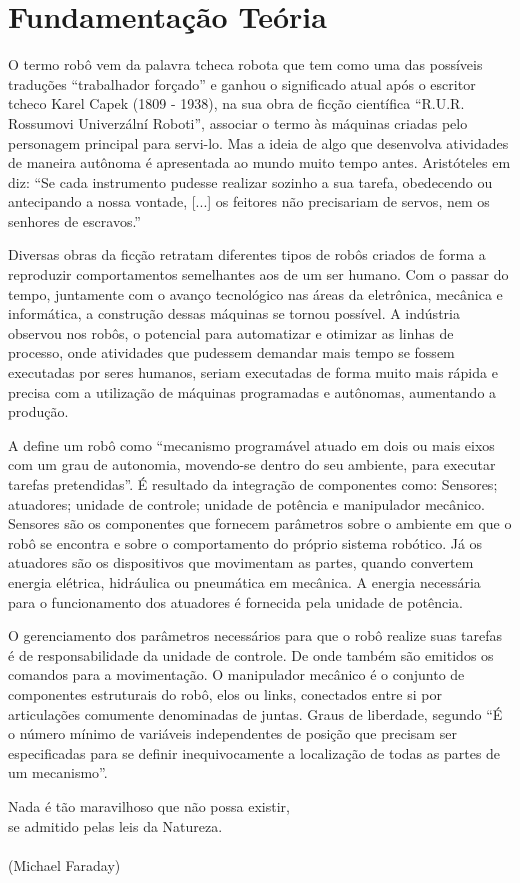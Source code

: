 \chapter{Fundamentação Teória}
\label{chap:concep}
O termo robô vem da palavra tcheca robota que tem como uma das possíveis traduções “trabalhador forçado” e ganhou o significado atual após o escritor tcheco Karel Capek (1809 - 1938), na sua obra de ficção científica “R.U.R. Rossumovi Univerzální Roboti”, associar o termo às máquinas criadas pelo personagem principal para servi-lo. Mas a ideia de algo que desenvolva atividades de maneira autônoma é apresentada ao mundo muito tempo antes. Aristóteles em \cite{aristoteles1985traduccao} diz: “Se cada instrumento pudesse realizar sozinho a sua tarefa, obedecendo ou antecipando a nossa vontade, [...] os feitores não precisariam de servos, nem os senhores de escravos.” 

Diversas obras da ficção retratam diferentes tipos de robôs criados de forma a reproduzir comportamentos semelhantes aos de um ser humano. Com o passar do tempo, juntamente com o avanço tecnológico nas áreas da eletrônica, mecânica e informática, a construção dessas máquinas se tornou possível. A indústria observou nos robôs, o potencial para automatizar e otimizar as linhas de processo, onde atividades que pudessem demandar mais tempo se fossem executadas por seres humanos, seriam executadas de forma muito mais rápida e precisa com a utilização de máquinas programadas e autônomas, aumentando a produção.

A \cite{iso2012} define um robô como “mecanismo programável atuado em dois ou mais eixos com um grau de autonomia, movendo-se dentro do seu ambiente, para executar tarefas pretendidas”. É resultado da integração de componentes como: Sensores; atuadores; unidade de controle; unidade de potência e manipulador mecânico. Sensores são os componentes que fornecem parâmetros sobre o ambiente em que o robô se encontra e sobre o comportamento do próprio sistema robótico. Já os atuadores são os dispositivos que movimentam as partes, quando convertem energia elétrica, hidráulica ou pneumática em mecânica. A energia necessária para o funcionamento dos atuadores é fornecida pela unidade de potência.

O gerenciamento dos parâmetros necessários para que o robô realize suas tarefas é de responsabilidade da unidade de controle. De onde também são emitidos os comandos para a movimentação. O manipulador mecânico é o conjunto de componentes estruturais do robô, elos ou links, conectados entre si por articulações comumente denominadas de juntas. Graus de liberdade, segundo \cite{romanorobotica} “É o número mínimo de variáveis independentes de posição que precisam ser especificadas para se definir inequivocamente a localização de todas as partes de um mecanismo”.
\begin{flushright}
  Nada é tão maravilhoso que não possa existir, \\
  se admitido pelas leis da Natureza. \\
  \ \\
  (Michael Faraday)
\end{flushright}

